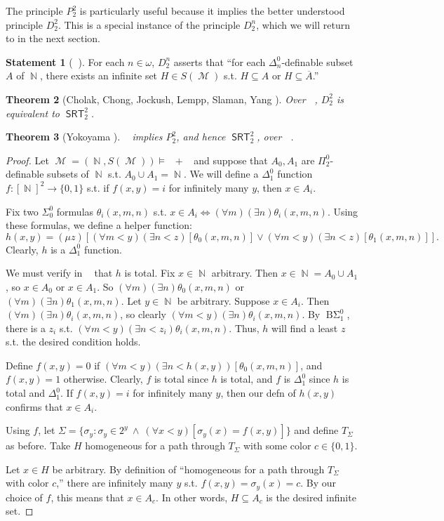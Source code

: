 \documentclass{amsart}
\theoremstyle{plain}
\newtheorem{theorem}{Theorem}
\theoremstyle{remark}
\theoremstyle{definition}
\newtheorem{statement}[theorem]{Statement}
\DeclareMathOperator{\BSigma}{B\Sigma}
\DeclareMathOperator{\RCA}{\mathsf{RCA}_0}
\DeclareMathOperator{\SRT}{\mathsf{SRT}}
\DeclareMathOperator{\RKLp}{\mathsf{RKL}^{(1)}}
\DeclareMathOperator{\N}{\mathbb{N}}
\DeclareMathOperator{\M}{\mathcal{M}}
\newcommand{\Pt}{P^2_2}		%
\begin{document}
The principle $\Pt$ is particularly useful because it implies the better understood principle $D^2_2$.  This is a special instance of the principle $D^n_2$, which we will return to in the next section.

\begin{statement}[$\RCA$]
For each $n\in\omega$, $D^n_2$ asserts that ``for each $\Delta^0_n$-definable subset $A$ of $\N$, there exists an infinite set $H\in S(\M)$ s.t. $H\subseteq A$ or $H\subseteq\overline{A}$.''  
\end{statement}


\begin{theorem}[Cholak, Chong, Jockush, Lempp, Slaman, Yang \cite{CJS,PART}]
Over $\RCA$, $D^2_2$ is equivalent to $\SRT^2_2$.
\end{theorem}


\begin{theorem}[Yokoyama \cite{yokoyama-rkl}]\label{thm.rklp-implies-srt22}
$\RKLp$ implies $\Pt$, and hence $\SRT^2_2$, over $\RCA$.  
\end{theorem}
\begin{proof}
Let $\M=(\N,S(\M))\models\RCA+\RKLp$ and suppose that $A_0,A_1$ are $\Pi^0_2$-definable subsets of $\N$ s.t. $A_0\cup A_1=\N$.  
We will define a $\Delta^0_1$ function $f:[\N]^2\rightarrow\{0,1\}$ s.t. 
	if $f(x,y)=i$ for infinitely many $y$, then $x\in A_i$.


Fix two $\Sigma^0_0$ formulas $\theta_i(x,m,n)$ s.t. $x\in A_i\iff (\forall m)(\exists n)\theta_i(x,m,n)$.
Using these formulas, we define a helper function:
%
$$h(x,y)=(\mu z)[(\forall m<y)(\exists n<z)[\theta_0(x,m,n)]\lor(\forall m<y)(\exists n<z)[\theta_1(x,m,n)]].$$
Clearly, $h$ is a $\Delta^0_1$ function.  

We must verify in $\RCA$ that $h$ is total.
Fix $x\in\N$ arbitrary.  Then $x\in\N=A_0\cup A_1$, so $x\in A_0$ or $x\in A_1$.  
So $(\forall m)(\exists n)\theta_0(x,m,n)$ or $(\forall m)(\exists n)\theta_1(x,m,n)$.
Let $y\in\N$ be arbitrary.
Suppose $x\in A_i$.  Then $(\forall m)(\exists n)\theta_i(x,m,n)$, so clearly $(\forall m<y)(\exists n)\theta_i(x,m,n)$.
By $\BSigma^0_1$, there is a $z_i$ s.t. $(\forall m<y)(\exists n<z_i)\theta_i(x,m,n)$. 
Thus, $h$ will find a least $z$ s.t. the desired condition holds.

Define $f(x,y)=0$ if $(\forall m<y)(\exists n<h(x,y))[\theta_0(x,m,n)]$, and $f(x,y)=1$ otherwise.
%
Clearly, $f$ is total since $h$ is total, and $f$ is $\Delta^0_1$ since $h$ is total and $\Delta^0_1$.  
%
If $f(x,y)=i$ for infinitely many $y$, then our defn of $h(x,y)$ confirms that $x\in A_i$.%

Using $f$, let $\Sigma=\{\sigma_y: \sigma_y\in 2^y\ \land\ (\forall x<y)[\sigma_y(x)=f(x,y)]\}$ and define $T_{\Sigma}$ as before.  
Take  $H$ homogeneous for a path through $T_{\Sigma}$ with some color $c\in\{0,1\}$.

Let $x\in H$ be arbitrary.  
By definition of ``homogeneous for a path through $T_{\Sigma}$ with color $c$,'' there are infinitely many $y$ s.t. $f(x,y)=\sigma_y(x)=c$.
By our choice of $f$, this means that $x\in A_c$.
%
In other words, $H\subseteq A_c$ is the desired infinite set.
\end{proof}
\end{document}
